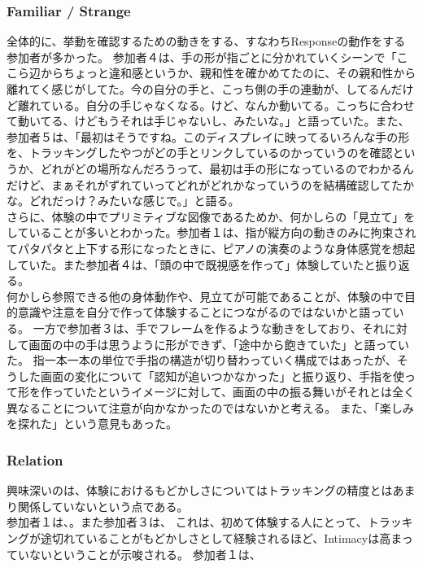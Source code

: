 \subsubsection{Familiar / Strange}
全体的に、挙動を確認するための動きをする、すなわちResponseの動作をする参加者が多かった。
参加者４は、手の形が指ごとに分かれていくシーンで「ここら辺からちょっと違和感というか、親和性を確かめてたのに、その親和性から離れてく感じがしてた。今の自分の手と、こっち側の手の連動が、してるんだけど離れている。自分の手じゃなくなる。けど、なんか動いてる。こっちに合わせて動いてる、けどもうそれは手じゃないし、みたいな。」と語っていた。また、参加者５は、「最初はそうですね。このディスプレイに映ってるいろんな手の形を、トラッキングしたやつがどの手とリンクしているのかっていうのを確認というか、どれがどの場所なんだろうって、最初は手の形になっているのでわかるんだけど、まぁそれがずれていってどれがどれかなっていうのを結構確認してたかな。どれだっけ？みたいな感じで。」と語る。\\
さらに、体験の中でプリミティブな図像であるためか、何かしらの「見立て」をしていることが多いとわかった。参加者１は、指が縦方向の動きのみに拘束されてパタパタと上下する形になったときに、ピアノの演奏のような身体感覚を想起していた。また参加者４は、「頭の中で既視感を作って」体験していたと振り返る。\\
何かしら参照できる他の身体動作や、見立てが可能であることが、体験の中で目的意識や注意を自分で作って体験することにつながるのではないかと語っている。
一方で参加者３は、手でフレームを作るような動きをしており、それに対して画面の中の手は思うように形ができず、「途中から飽きていた」と語っていた。
指一本一本の単位で手指の構造が切り替わっていく構成ではあったが、そうした画面の変化について「認知が追いつかなかった」と振り返り、手指を使って形を作っていたというイメージに対して、画面の中の振る舞いがそれとは全く異なることについて注意が向かなかったのではないかと考える。
また、「楽しみを探れた」という意見もあった。
\subsubsection{Relation}
興味深いのは、体験におけるもどかしさについてはトラッキングの精度とはあまり関係していないという点である。\\
参加者１は、。また参加者３は、
これは、初めて体験する人にとって、トラッキングが途切れていることがもどかしさとして経験されるほど、Intimacyは高まっていないということが示唆される。
参加者１は、